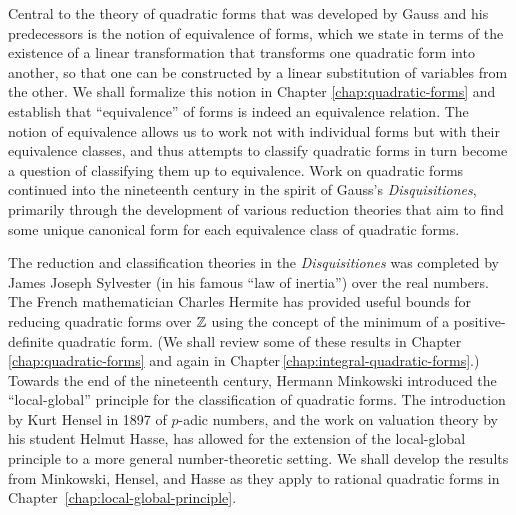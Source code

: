 Central to the theory of quadratic forms that was developed by Gauss and his predecessors is the notion of equivalence of forms, which we state in terms of the existence of a linear transformation that transforms one quadratic form into another, so that one can be constructed by a linear substitution of variables from the other. We shall formalize this notion in Chapter \ref{chap:quadratic-forms} and establish that ``equivalence'' of forms is indeed an equivalence relation. The notion of equivalence allows us to work not with individual forms but with their equivalence classes, and thus attempts to classify quadratic forms in turn become a question of classifying them up to equivalence. Work on quadratic forms continued into the nineteenth century in the spirit of Gauss's \emph{Disquisitiones}, primarily through the development of various reduction theories that aim to find some unique canonical form for each equivalence class of quadratic forms.

The reduction and classification theories in the \emph{Disquisitiones} was completed by James Joseph Sylvester (in his famous ``law of inertia'') over the real numbers. The French mathematician Charles Hermite has provided useful bounds for reducing quadratic forms over \(\mathbb{Z}\) using the concept of the minimum of a positive-definite quadratic form. \cite{gerstein2008basic} (We shall review some of these results in Chapter \ref{chap:quadratic-forms} and again in Chapter\,\ref{chap:integral-quadratic-forms}.) Towards the end of the nineteenth century, Hermann Minkowski introduced the ``local-global'' principle for the classification of quadratic forms. The introduction by Kurt Hensel in 1897 of \(p\)-adic numbers, and the work on valuation theory by his student Helmut Hasse, has allowed for the extension of the local-global principle to a more general number-theoretic setting. \cite{gerstein2008basic,hensel1913zahlentheorie,hasse1922uber} We shall develop the results from Minkowski, Hensel, and Hasse as they apply to rational quadratic forms in Chapter \,\ref{chap:local-global-principle}.

